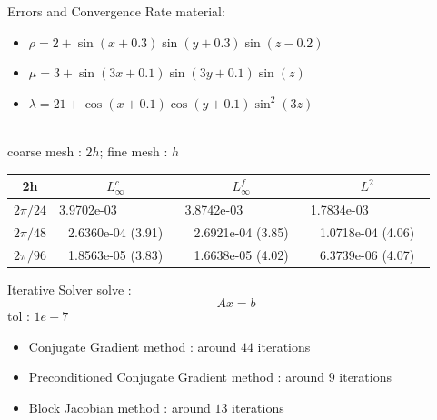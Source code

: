 \documentclass{beamer}
\begin{document}
\begin{frame}{Errors and Convergence Rate}
material:
\begin{itemize}
    \item $\rho = 2 + \sin(x+0.3)\sin(y+0.3)\sin(z-0.2)$
    \item $\mu = 3 + \sin(3x+0.1)\sin(3y+0.1)\sin(z)$
    \item $\lambda = 21 + \cos(x+0.1)\cos(y+0.1)\sin^2(3z)$
\end{itemize}
~\\
coarse mesh : $2h$; fine mesh : $h$
\begin{table}[htb]
\begin{center}
  \begin{tabular}{|c|c c c|}
  \hline
 2h   & $L_{\infty}^{c}$ & $L_{\infty}^{f}$ & $L^2$  \\
\hline
  $2\pi/24$ &3.9702e-03 ~~~~~~~~ & 3.8742e-03 ~~~~~~~~ & 1.7834e-03 ~~~~~~~~\\
\hline
  $2\pi/48$ &2.6360e-04 (3.91) & 2.6921e-04 (3.85) & 1.0718e-04 (4.06)\\
  \hline 
  $2\pi/96$ &1.8563e-05 (3.83) & 1.6638e-05 (4.02) & 6.3739e-06 (4.07)\\
  \hline
\end{tabular}
\end{center}
\end{table} 

\end{frame}

\begin{frame}{Iterative Solver}
solve : 
\[ Ax = b\]
tol : $1e-7$ 
 \begin{itemize}
     \item Conjugate Gradient method : around $44$ iterations
     \item Preconditioned Conjugate Gradient method : around $9$ iterations
     \item Block Jacobian method : around $13$ iterations
 \end{itemize}  
\end{frame}
\end{document}
